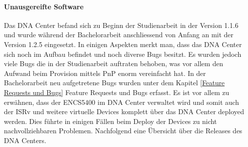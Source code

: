 \paragraph{Unausgereifte Software} 
Das DNA Center befand sich zu Beginn der Studienarbeit in der Version 1.1.6 und wurde während der Bachelorarbeit anschliessend von Anfang an mit der Version 1.2.5 eingesetzt. In einigen Aspekten merkt man, dass das DNA Center sich noch im Aufbau befindet und noch diverse Bugs besitzt. Es wurden jedoch viele Bugs die in der Studienarbeit auftraten behoben, was vor allem den Aufwand beim Provision mittels PnP enorm vereinfacht hat. In der Bachelorarbeit neu aufgetretene Bugs wurden unter dem Kapitel \ref{Feature Requests und Bugs} Feature Requests und Bugs erfasst. Es ist vor allem zu erwähnen, dass der ENCS5400 im DNA Center verwaltet wird und somit auch der ISRv und weitere virtuelle Devices komplett über das DNA Center deployed werden. Dies führte in einigen Fällen beim Deploy der Devices zu nicht nachvollziehbaren Problemen. Nachfolgend eine Übersicht über die Releases des DNA Centers.

